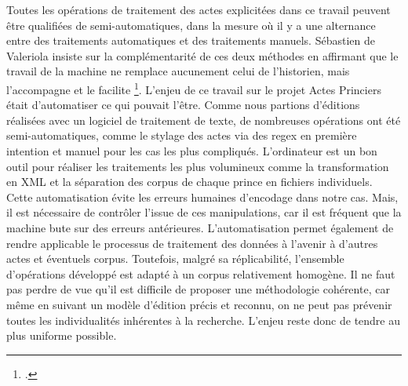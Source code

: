 \par Toutes les opérations de traitement des actes explicitées dans ce travail peuvent être qualifiées de semi-automatiques, dans la mesure où il y a une alternance entre des traitements automatiques et des traitements manuels. Sébastien de Valeriola insiste sur la complémentarité de ces deux méthodes en affirmant que \og le travail de la machine ne remplace aucunement celui de l’historien, mais l’accompagne et le facilite \fg \footnote{\cite{devaleriolaOrdinateurAuService2020}.}. L'enjeu de ce travail sur le projet \og Actes Princiers \fg \space était d'automatiser ce qui pouvait l'être. Comme nous partions d'éditions réalisées avec un logiciel de traitement de texte, de nombreuses opérations ont été semi-automatiques, comme le stylage des actes via des regex en première intention et manuel pour les cas les plus compliqués. L'ordinateur est un bon outil pour réaliser les traitements les plus volumineux comme la transformation en XML et la séparation des corpus de chaque prince en fichiers individuels. Cette automatisation évite les erreurs humaines d'encodage dans notre cas. Mais, il est nécessaire de contrôler l'issue de ces manipulations, car il est fréquent que la machine bute sur des erreurs antérieures. L'automatisation permet également de rendre applicable le processus de traitement des données à l'avenir à d'autres actes et éventuels corpus. Toutefois, malgré sa réplicabilité, l'ensemble d'opérations développé est adapté à un corpus relativement homogène. Il ne faut pas perdre de vue qu'il est difficile de proposer une méthodologie cohérente, car même en suivant un modèle d'édition précis et reconnu, on ne peut pas prévenir toutes les individualités inhérentes à la recherche. L'enjeu reste donc de tendre au plus uniforme possible.
\newline 

